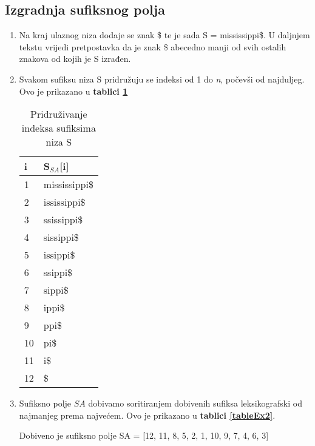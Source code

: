 \documentclass[11pt]{article}
\begin{document}
\subsection{Izgradnja sufiksnog polja}
\begin{enumerate}
\item Na kraj ulaznog niza dodaje se znak \$ te je sada S =  mississippi\$. U daljnjem tekstu vrijedi pretpostavka da je znak \$ abecedno manji od svih ostalih znakova od kojih je S izrađen.
\item Svakom sufiksu niza S pridružuju se indeksi od 1 do \textit{n}, počevši od najduljeg. Ovo je prikazano u \textbf{tablici \ref{tableEx1}}

\begin{table}
\caption{Pridruživanje indeksa sufiksima niza S}
\label{tableEx1}
\begin{center}
\begin{tabular}{ll}
\toprule
i & S$_{SA}$[i] \\
\midrule
1 & mississippi\$ \\
2 & ississippi\$ \\
3 & ssissippi\$ \\
4 & sissippi\$ \\
5 & issippi\$ \\
6 & ssippi\$ \\
7 & sippi\$ \\
8 & ippi\$ \\
9 & ppi\$ \\
10 & pi\$ \\
11 & i\$ \\
12 & \$ \\
\bottomrule
\end{tabular}
\end{center}
\end{table}

\item Sufiksno polje \(SA\) dobivamo soritiranjem dobivenih sufiksa leksikografski od najmanjeg prema najvećem. Ovo je prikazano u \textbf{tablici \ref{tableEx2}}.

Dobiveno je sufiksno polje SA = [12, 11, 8, 5, 2, 1, 10, 9, 7, 4, 6, 3]


\end{enumerate}
\end{document}
